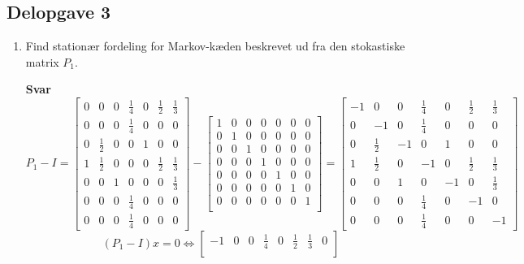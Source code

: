 \documentclass[10pt,a4paper]{article}
\begin{document}
\subsection*{Delopgave 3}
\begin{enumerate}
	\item Find stationær fordeling for Markov-kæden beskrevet ud fra den stokastiske matrix $P_1$.
	\item[\textbf{Svar}] \[P_1-I=\begin{bmatrix}
		0 & 0 & 0 & \frac{1}{4} & 0 & \frac{1}{2} & \frac{1}{3}\\
		0 & 0 & 0 & \frac{1}{4} & 0 & 0 & 0 \\
		0 & \frac{1}{2} & 0 & 0 & 1 & 0 & 0 \\
		1 & \frac{1}{2} & 0 & 0 & 0 & \frac{1}{2} & \frac{1}{3}\\
		0 & 0 & 1 & 0 & 0 & 0 & \frac{1}{3}\\
		0 & 0 & 0 & \frac{1}{4} & 0 & 0 & 0\\
		0 & 0 & 0 & \frac{1}{4} & 0 & 0 & 0
	\end{bmatrix}-\begin{bmatrix}
		1 & 0 & 0 & 0 & 0 & 0 & 0 \\
		0 & 1 & 0 & 0 & 0 & 0 & 0 \\
		0 & 0 & 1 & 0 & 0 & 0 & 0 \\
		0 & 0 & 0 & 1 & 0 & 0 & 0 \\
		0 & 0 & 0 & 0 & 1 & 0 & 0 \\
		0 & 0 & 0 & 0 & 0 & 1 & 0 \\
		0 & 0 & 0 & 0 & 0 & 0 & 1 \\
	\end{bmatrix}=\begin{bmatrix}
		-1 & 0 & 0 & \frac{1}{4} & 0 & \frac{1}{2} & \frac{1}{3}\\
		0 & -1 & 0 & \frac{1}{4} & 0 & 0 & 0 \\
		0 & \frac{1}{2} & -1 & 0 & 1 & 0 & 0 \\
		1 & \frac{1}{2} & 0 & -1 & 0 & \frac{1}{2} & \frac{1}{3}\\
		0 & 0 & 1 & 0 & -1 & 0 & \frac{1}{3}\\
		0 & 0 & 0 & \frac{1}{4} & 0 & -1 & 0\\
		0 & 0 & 0 & \frac{1}{4} & 0 & 0 & -1
	\end{bmatrix}\]
	\[
	(P_1-I)x=0 \Longleftrightarrow \begin{bmatrix}
		-1 & 0 & 0 & \frac{1}{4} & 0 & \frac{1}{2} & \frac{1}{3} & 0\\

\end{bmatrix}\]
\end{enumerate}
\end{document}
